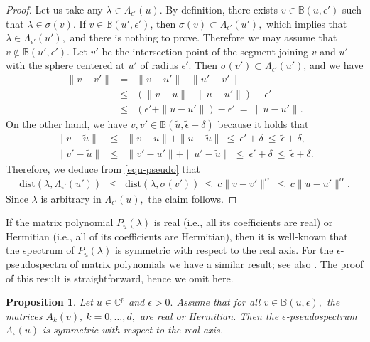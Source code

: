 \documentclass[10pt,reqno]{amsart}
\theoremstyle{break-italic}
\theoremstyle{break-italic}
\theoremstyle{break-italic}
\theoremstyle{break-italic}
\theoremstyle{break-italic}
\theoremstyle{break-italic}
\theoremstyle{break-italic}
\theoremstyle{break-italic}
\theoremstyle{break-roman}
\theoremstyle{standard}
\theoremstyle{varthm-roman}
\theoremstyle{varthm-italic}
\theoremstyle{varthm-roman-break}
\theoremstyle{varthm-italic-break}
\theoremstyle{varthm-roman-no-punctuation}
\theoremstyle{varthm-italic-no-punctuation}
\numberwithin{equation}{section}
\newtheorem{proposition}{Proposition}[section]
\begin{document}
\begin{proof}
Let us take any  $\lambda \in \Lambda_{\epsilon'}(u)$. By definition, there exists $v \in \mathbb B(u, {\epsilon'})$ such that $\lambda \in \sigma(v)$.  If $v \in \mathbb B(u',{\epsilon'})$, then $\sigma(v)\subset \Lambda_{\epsilon'}(u'),$ which implies that  $\lambda \in \Lambda_{\epsilon'}(u'),$ and there is nothing to prove. Therefore we may assume that $v \not \in \mathbb B(u', {\epsilon'})$.   Let ${v'}$ be the intersection point of the segment joining $v$ and $u'$ with the sphere centered at $u'$ of radius ${\epsilon'}.$  Then $\sigma({v'})\subset \Lambda_{\epsilon'}(u')$, and we have
\begin{eqnarray*}
\|v-{v'}\|  & =  & \|v-u'\| -  \|u'-{v'}\| \\
 & \leq  &  (\|v-u\| + \|u-u'\|) - {\epsilon'} \\
&    \leq  & ({\epsilon'} +  \|u-u'\|) - {\epsilon'} \  =  \  \|u - u'\|.
\end{eqnarray*}
On the other hand, we have $v, {v'} \in \mathbb{B}(\tilde{u}, \tilde{\epsilon} + \delta)$ because it holds that
\begin{eqnarray*}
\|v - \tilde{u}\|  & \le  & \|v - u\| + \|u - \tilde{u}\| \ \le \ {\epsilon'} + \delta \ \le \ \tilde{\epsilon} + \delta, \\
\|{v'} - \tilde{u}\|  & \le  & \|{v'} - u'\| + \|u' - \tilde{u}\| \ \le \ {\epsilon'} + \delta \ \le \ \tilde{\epsilon} + \delta.
\end{eqnarray*}
Therefore, we deduce from \eqref{equ-pseudo} that
\begin{eqnarray*}
\mbox{dist}(\lambda, \Lambda_{\epsilon'}(u')) & \leq & \mbox{dist}(\lambda, \sigma({v'})) \ \leq \ c \|v - {v'}\|^\alpha \ \leq \ c \|u - u'\|^\alpha.
\end{eqnarray*}
Since $\lambda$ is arbitrary in $\Lambda_{\epsilon'}(u),$ the claim follows.
\end{proof}

If the matrix polynomial $P_{u}(\lambda)$ is real (i.e., all its coefficients are real) or Hermitian (i.e., all of its coefficients are Hermitian), then it is well-known that the spectrum of $P_{u}(\lambda)$ is symmetric with respect to the real axis. For the $\epsilon$-pseudospectra of matrix polynomials we have a similar result; see also \cite[Proposition~2.1]{Lancaster2005}.  The proof of this result is straightforward, hence we omit here.

\begin{proposition} \label{Proposition31}
Let ${u} \in \mathbb{C}^p$ and $\epsilon > 0.$ Assume that for all $v \in \mathbb{B}({u}, \epsilon),$ the matrices $A_k(v), ~ k = 0, \ldots, d, $ are real or Hermitian. Then the $\epsilon$-pseudospectrum $\Lambda_\epsilon({u})$ is symmetric with respect to the real axis.
\end{proposition}
\end{document}
